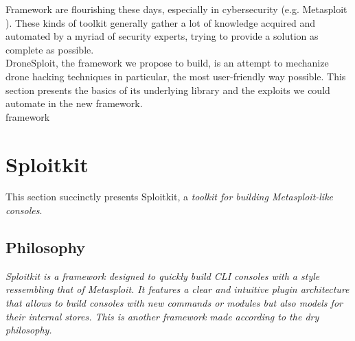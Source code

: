 \begin{chaptercover}{Framework}%
{
{\large \hyphenation{}  are flourishing these days, especially in cybersecurity (e.g. Metasploit \cite{metasploit}). These kinds of toolkit generally gather a lot of knowledge acquired and automated by a myriad of security experts, trying to provide a solution as complete as possible. \newline \\ DroneSploit, the framework we propose to build, is an attempt to mechanize drone hacking techniques in particular, the most user-friendly way possible. This section presents the basics of its underlying library and the exploits we could automate in the new framework. \newline\\}}%
{framework}


\section{Sploitkit}

This section succinctly presents Sploitkit, a \textit{toolkit for building Metasploit-like consoles}. \cite{sploitkit}

\subsection{Philosophy}

\textit{Sploitkit is a framework designed to quickly build CLI consoles with a style ressembling that of Metasploit. It features a clear and intuitive plugin architecture that allows to build consoles with new commands or modules but also models for their internal stores. This is another framework made according to the \acrshort{dry} philosophy.} \cite{sploitkit-docs}


\end{chaptercover}
